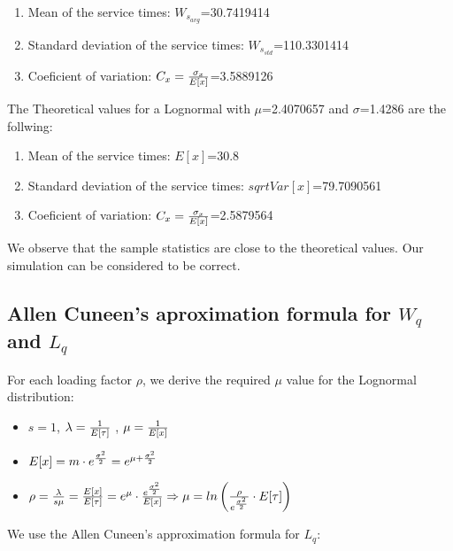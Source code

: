 \documentclass[]{article}
\providecommand{\tightlist}{%
  \setlength{\itemsep}{0pt}\setlength{\parskip}{0pt}}
\begin{document}
\begin{enumerate}
\def\labelenumi{\arabic{enumi}.}
\tightlist
\item
  Mean of the service times: \(W_{s_{avg}}\)=30.7419414
\item
  Standard deviation of the service times: \(W_{s_{std}}\)=110.3301414
\item
  Coeficient of variation: \(C_{x}={ \sigma_{x} \over E[x] }\)=3.5889126
\end{enumerate}

The Theoretical values for a Lognormal with \(\mu\)=2.4070657 and
\(\sigma\)=1.4286 are the follwing:

\begin{enumerate}
\def\labelenumi{\arabic{enumi}.}
\tightlist
\item
  Mean of the service times: \(E[x]\)=30.8
\item
  Standard deviation of the service times: \(sqrt{Var[x]}\)=79.7090561
\item
  Coeficient of variation: \(C_{x}={ \sigma_{x} \over E[x] }\)=2.5879564
\end{enumerate}

We observe that the sample statistics are close to the theoretical
values. Our simulation can be considered to be correct.

\subsection{\texorpdfstring{Allen Cuneen's aproximation formula for
\(W_{q}\) and
\(L_{q}\)}{Allen Cuneen's aproximation formula for W\_\{q\} and L\_\{q\}}}\label{allen-cuneens-aproximation-formula-for-w_q-and-l_q}

For each loading factor \(\rho\), we derive the required \(\mu\) value
for the Lognormal distribution:

\begin{itemize}
\tightlist
\item
  \(s = 1\), \(\lambda = { 1 \over E[\tau] }\) ,
  \(\mu = {1 \over E[x]}\)
\item
  \(E[x] = m \cdot e^{\sigma^{2} \over 2} = e^{\mu + {\sigma^{2} \over 2} }\)
\item
  \(\rho = { \lambda \over {s\mu}} = { E[x] \over E[\tau] } = e^{\mu} \cdot { e^{\sigma^{2} \over 2} \over E[x] } \Rightarrow \mu = ln \left( { \rho \over e^{ \sigma^{2} \over 2 } } \cdot E[\tau] \right)\)
\end{itemize}

We use the Allen Cuneen's approximation formula for \(L_{q}\):
\end{document}
